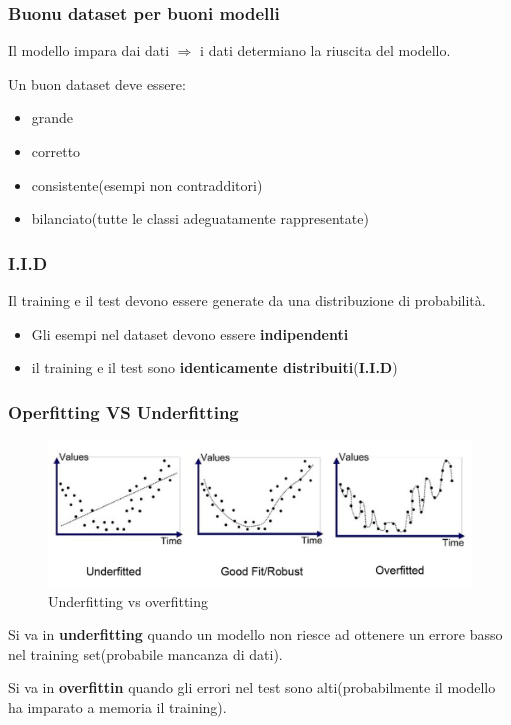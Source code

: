 \subsubsection{Buonu dataset per buoni modelli}
Il modello impara dai dati $\Rightarrow$ i dati determiano la riuscita del modello.

Un buon dataset deve essere:
\begin{itemize}
    \item grande
    \item corretto
    \item consistente(esempi non contradditori)
    \item bilanciato(tutte le classi adeguatamente rappresentate)
\end{itemize}

\subsubsection{I.I.D}
Il training e il test devono essere generate da una distribuzione di probabilità.

\begin{itemize}
    \item Gli esempi nel dataset devono essere \textbf{indipendenti}
    \item il training e il test sono \textbf{identicamente distribuiti}(\textbf{I.I.D})
\end{itemize}


\subsubsection{Operfitting VS Underfitting}
\begin{figure}[H]
    \centering
    \includegraphics[width=0.6\linewidth]{imgs/underfitting_overfitting}
    \caption{Underfitting vs overfitting}
    \label{fig:under_over_fitting}
\end{figure}
Si va in \textbf{underfitting} quando un modello non riesce ad ottenere un errore
basso nel training set(probabile mancanza di dati).

Si va in \textbf{overfittin} quando gli errori nel test sono alti(probabilmente
il modello ha imparato a memoria il training).

